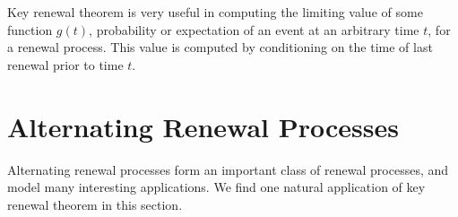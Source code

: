 \documentclass[a4paper,10pt,english]{article}
\begin{document}
Key renewal theorem is very useful in computing the limiting value of some function $g(t)$, probability or expectation of an event at an arbitrary time $t$, for a renewal process. This value is computed by conditioning on the time of last renewal prior to time $t$.

%

\section{Alternating Renewal Processes}
Alternating renewal processes form an important class of renewal processes, and model many interesting applications. 
We find one natural application of  key renewal theorem  in this section. 
\end{document}
